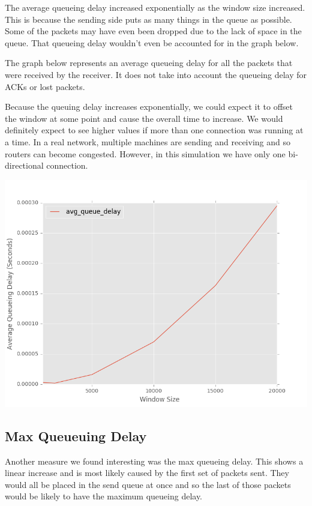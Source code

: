 \documentclass[11pt]{article}
\begin{document}
The average queueing delay increased exponentially as the window size increased. This is because the sending side puts as many things in the queue as possible. Some of the packets may have even been dropped due to the lack of space in the queue. That queueing delay wouldn't even be accounted for in the graph below.

\vspace{5mm}

The graph below represents an average queueing delay for all the packets that were received by the receiver. It does not take into account the queueing delay for ACKs or lost packets.

\vspace{5mm}

Because the queuing delay increases exponentially, we could expect it to offset the window at some point and cause the overall time to increase. We would definitely expect to see higher values if more than one connection was running at a time. In a real network, multiple machines are sending and receiving and so routers can become congested. However, in this simulation we have only one bi-directional connection.

\vspace{5mm}

\includegraphics[width=17cm]{graphs/avg-queue-graph.png}

\clearpage
\subsection{Max Queueuing Delay}

Another measure we found interesting was the max queueing delay. This shows a linear increase and is most likely caused by the first set of packets sent. They would all be placed in the send queue at once and so the last of those packets would be likely to have the maximum queueing delay.
\end{document}
